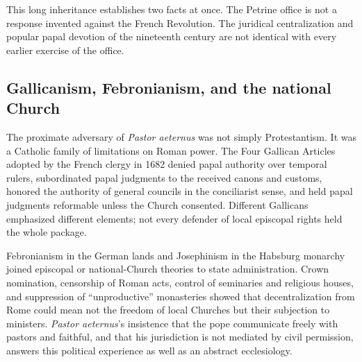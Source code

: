 This long inheritance establishes two facts at once. The Petrine office is not a response invented against the French Revolution. The juridical centralization and popular papal devotion of the nineteenth century are not identical with every earlier exercise of the office.

\subsection{Gallicanism, Febronianism, and the national Church}

The proximate adversary of \emph{Pastor aeternus} was not simply Protestantism. It was a Catholic family of limitations on Roman power. The Four Gallican Articles adopted by the French clergy in 1682 denied papal authority over temporal rulers, subordinated papal judgments to the received canons and customs, honored the authority of general councils in the conciliarist sense, and held papal judgments reformable unless the Church consented. Different Gallicans emphasized different elements; not every defender of local episcopal rights held the whole package.

Febronianism in the German lands and Josephinism in the Habsburg monarchy joined episcopal or national-Church theories to state administration. Crown nomination, censorship of Roman acts, control of seminaries and religious houses, and suppression of “unproductive” monasteries showed that decentralization from Rome could mean not the freedom of local Churches but their subjection to ministers. \emph{Pastor aeternus}'s insistence that the pope communicate freely with pastors and faithful, and that his jurisdiction is not mediated by civil permission, answers this political experience as well as an abstract ecclesiology.

